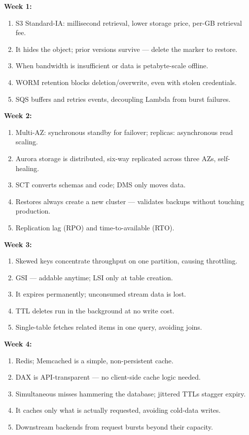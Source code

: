 \documentclass[11pt, a4paper]{article}
\begin{document}
\noindent\textbf{Week 1:}
\begin{enumerate}[itemsep=0pt, leftmargin=2em]
    \item S3 Standard-IA: millisecond retrieval, lower storage price, per-GB retrieval fee.
    \item It hides the object; prior versions survive --- delete the marker to restore.
    \item When bandwidth is insufficient or data is petabyte-scale offline.
    \item WORM retention blocks deletion/overwrite, even with stolen credentials.
    \item SQS buffers and retries events, decoupling Lambda from burst failures.
\end{enumerate}
\noindent\textbf{Week 2:}
\begin{enumerate}[itemsep=0pt, leftmargin=2em]
    \item Multi-AZ: synchronous standby for failover; replicas: asynchronous read scaling.
    \item Aurora storage is distributed, six-way replicated across three AZs, self-healing.
    \item SCT converts schemas and code; DMS only moves data.
    \item Restores always create a new cluster --- validates backups without touching production.
    \item Replication lag (RPO) and time-to-available (RTO).
\end{enumerate}
\noindent\textbf{Week 3:}
\begin{enumerate}[itemsep=0pt, leftmargin=2em]
    \item Skewed keys concentrate throughput on one partition, causing throttling.
    \item GSI --- addable anytime; LSI only at table creation.
    \item It expires permanently; unconsumed stream data is lost.
    \item TTL deletes run in the background at no write cost.
    \item Single-table fetches related items in one query, avoiding joins.
\end{enumerate}
\noindent\textbf{Week 4:}
\begin{enumerate}[itemsep=0pt, leftmargin=2em]
    \item Redis; Memcached is a simple, non-persistent cache.
    \item DAX is API-transparent --- no client-side cache logic needed.
    \item Simultaneous misses hammering the database; jittered TTLs stagger expiry.
    \item It caches only what is actually requested, avoiding cold-data writes.
    \item Downstream backends from request bursts beyond their capacity.
\end{enumerate}
\end{document}
